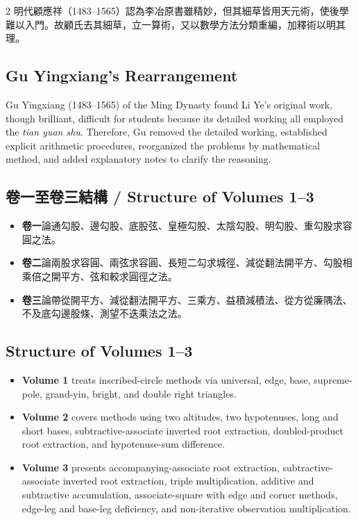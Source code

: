 \documentclass[11pt,a4paper]{article}
\newcounter{problem}[section]
\begin{document}
\begin{paracol}{2}
明代顧應祥（1483--1565）認為李冶原書雖精妙，但其細草皆用天元術，使後學難以入門。故顧氏去其細草，立一算術，又以數學方法分類重編，加釋術以明其理。

\switchcolumn

\subsection*{Gu Yingxiang's Rearrangement}

Gu Yingxiang (1483--1565) of the Ming Dynasty found Li Ye's original work, though brilliant, difficult for students because its detailed working all employed the \textit{tian yuan shu}. Therefore, Gu removed the detailed working, established explicit arithmetic procedures, reorganized the problems by mathematical method, and added explanatory notes to clarify the reasoning.

\switchcolumn

\subsection*{卷一至卷三結構 / Structure of Volumes 1--3}

\begin{itemize}
\item \textbf{卷一}論通勾股、邊勾股、底股弦、皇極勾股、太陰勾股、明勾股、重勾股求容圓之法。
\item \textbf{卷二}論兩股求容圓、兩弦求容圓、長短二勾求城徑、減從翻法開平方、勾股相乘倍之開平方、弦和較求圓徑之法。
\item \textbf{卷三}論帶從開平方、減從翻法開平方、三乘方、益積減積法、從方從廉隅法、不及底勾邊股條、測望不迭乘法之法。
\end{itemize}

\switchcolumn

\subsection*{Structure of Volumes 1--3}

\begin{itemize}
\item \textbf{Volume 1} treats inscribed-circle methods via universal, edge, base, supreme-pole, grand-yin, bright, and double right triangles.
\item \textbf{Volume 2} covers methods using two altitudes, two hypotenuses, long and short bases, subtractive-associate inverted root extraction, doubled-product root extraction, and hypotenuse-sum difference.
\item \textbf{Volume 3} presents accompanying-associate root extraction, subtractive-associate inverted root extraction, triple multiplication, additive and subtractive accumulation, associate-square with edge and corner methods, edge-leg and base-leg deficiency, and non-iterative observation multiplication.
\end{itemize}


\end{paracol}
\end{document}
